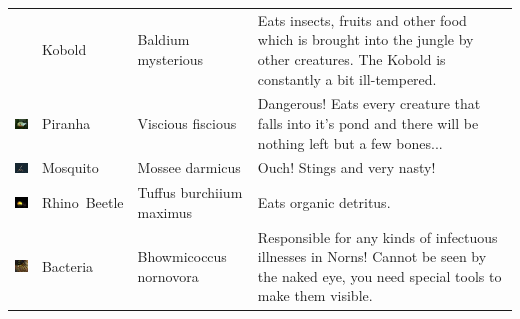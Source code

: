 \documentclass[11pt,twoside,a4paper]{article}
\begin{document}
\begin{longtable}{ p{1.60cm} p{1.95cm} p{2.55cm} p{11.00cm} }
																&	Kobold			&	Baldium \newline mysterious		
																&	Eats insects, fruits and other food which is brought into the jungle by other creatures. The Kobold is constantly a bit ill-tempered.	\\
	\begin{minipage}[ht]{1.55cm} \includegraphics[width=1.50cm]{img/piranha2.jpg} \end{minipage}		
																&	Piranha			&	Viscious \newline fiscious		
																&	Dangerous! Eats every creature that falls into it's pond and there will be nothing left but a few bones...	\\
	\begin{minipage}[ht]{1.55cm} \includegraphics[width=1.50cm]{img/mossie.jpg} \end{minipage}		
																&	Mosquito		&	Mossee \newline darmicus		
																&	Ouch! Stings and very nasty!	\\
	\begin{minipage}[ht]{1.55cm} \includegraphics[width=1.50cm]{img/beetle.jpg} \end{minipage}		
																&	Rhino~Beetle	&	Tuffus \newline burchiium maximus		
																&	Eats organic detritus.\\
	\begin{minipage}[ht]{1.55cm} \includegraphics[width=1.50cm]{img/baks.jpg} \end{minipage}		
																&	Bacteria		&	Bhowmicoccus nornovora		
																&	Responsible for any kinds of infectuous illnesses in Norns! Cannot be seen by the naked eye, you need special tools to make them visible.	\\
\end{longtable} ~\\
\end{document}
